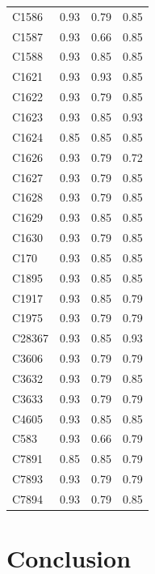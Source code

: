 \documentclass[a4paper,10pt,twoside,fleqn]{article}
\begin{document}
\begin{table}
\begin{tabular}{lrrr}
C1586     & 0.93  & 0.79  & 0.85 \\
C1587     & 0.93  & 0.66  & 0.85 \\
C1588     & 0.93  & 0.85  & 0.85 \\
C1621     & 0.93  & 0.93  & 0.85 \\
C1622     & 0.93  & 0.79  & 0.85 \\
C1623     & 0.93  & 0.85  & 0.93 \\
C1624     & 0.85  & 0.85  & 0.85 \\
C1626     & 0.93  & 0.79  & 0.72 \\
C1627     & 0.93  & 0.79  & 0.85 \\
C1628     & 0.93  & 0.79  & 0.85 \\
C1629     & 0.93  & 0.85  & 0.85 \\
C1630     & 0.93  & 0.79  & 0.85 \\
C170      & 0.93  & 0.85  & 0.85 \\
C1895     & 0.93  & 0.85  & 0.85 \\
C1917     & 0.93  & 0.85  & 0.79 \\
C1975     & 0.93  & 0.79  & 0.79 \\
C28367    & 0.93  & 0.85  & 0.93 \\
C3606     & 0.93  & 0.79  & 0.79 \\
C3632     & 0.93  & 0.79  & 0.85 \\
C3633     & 0.93  & 0.79  & 0.79 \\
C4605     & 0.93  & 0.85  & 0.85 \\
C583      & 0.93  & 0.66  & 0.79 \\
C7891     & 0.85  & 0.85  & 0.79 \\
C7893     & 0.93  & 0.79  & 0.79 \\
C7894     & 0.93  & 0.79  & 0.85 \\
\bottomrule
\end{tabular}
\end{table}





\section{Conclusion}\label{sec:conclusion}







\end{document}
